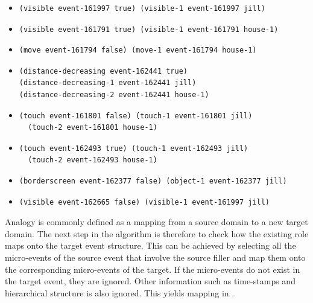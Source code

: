 \begin{itemize}
\item \begin{lstlisting}
(visible event-161997 true) (visible-1 event-161997 jill)
\end{lstlisting}

\item \begin{lstlisting}
(visible event-161791 true) (visible-1 event-161791 house-1)
\end{lstlisting}

\item 
\begin{lstlisting}
(move event-161794 false) (move-1 event-161794 house-1)
\end{lstlisting}


\item\begin{lstlisting}
(distance-decreasing event-162441 true)
(distance-decreasing-1 event-162441 jill)
(distance-decreasing-2 event-162441 house-1)
\end{lstlisting}

\item 
\begin{lstlisting}
(touch event-161801 false) (touch-1 event-161801 jill)
  (touch-2 event-161801 house-1)
\end{lstlisting}

\item \begin{lstlisting}
(touch event-162493 true) (touch-1 event-162493 jill)
  (touch-2 event-162493 house-1)
\end{lstlisting}

\item\begin{lstlisting}
(borderscreen event-162377 false) (object-1 event-162377 jill)
\end{lstlisting}

\item \begin{lstlisting}
(visible event-162665 false) (visible-1 event-161997 jill)
\end{lstlisting}
\end{itemize} 

Analogy is commonly defined as a mapping from a source domain to a new target domain. The next step in the algorithm is therefore to check how the existing role maps onto the target event structure. This can be achieved by selecting all the micro-events of the source event that involve the source filler and map them onto the corresponding micro-events of the target. If the micro-events do not exist in the target event, they are ignored. Other information such as time-stamps and hierarchical structure is also ignored. This yields mapping in .

